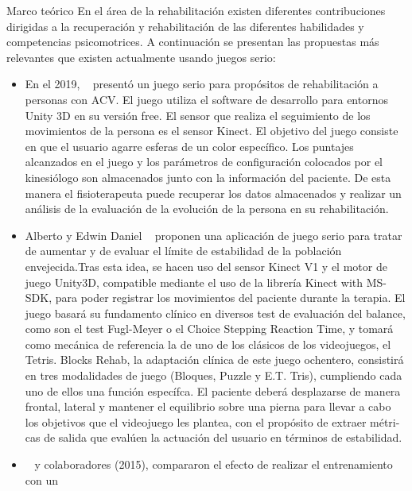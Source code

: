 \begin{thesischapter}{1} {Marco teórico}
    \vspace{10pt}
    En el área de la rehabilitación %
    existen diferentes contribuciones dirigidas a la recuperación y rehabilitación de las diferentes habilidades y competencias psicomotrices. 
    A continuación se presentan las propuestas más relevantes que existen actualmente usando juegos serio:
    \begin{itemize}
        \item En el 2019, ~\cite{rodriguez2019design} presentó un juego serio para propósitos de rehabilitación a personas con ACV. El juego 
        utiliza el software de desarrollo para entornos Unity 3D en su versión free. El sensor que realiza el seguimiento de los movimientos 
        de la persona es el sensor Kinect. El objetivo del juego consiste en que el usuario agarre esferas de un color específico. Los puntajes 
        alcanzados en el juego y los parámetros de configuración colocados por el kinesiólogo son almacenados junto con la información del paciente. 
        De esta manera el fisioterapeuta puede recuperar los datos almacenados y realizar un análisis de la evaluación de la evolución de la persona 
        en su rehabilitación.
        \item Alberto y Edwin Daniel ~\cite{morales2019desarrollo} proponen una aplicación de juego serio para tratar de aumentar y de evaluar 
        el límite de estabilidad de la población envejecida.Tras esta idea, se hacen uso del sensor Kinect V1 y el 
        motor de juego Unity3D, compatible mediante el uso de la librería Kinect with MS-SDK, para poder registrar los movimientos del paciente durante 
        la terapia. El juego basará su fundamento clínico en diversos test de evaluación del balance, como son el test Fugl-Meyer o el Choice Stepping 
        Reaction Time, y tomará como mecánica de referencia la de uno de los clásicos de los videojuegos, el Tetris. Blocks Rehab, la adaptación clínica 
        de este juego ochentero, consistirá en tres modalidades de juego (Bloques, Puzzle y E.T. Tris), cumpliendo cada uno de ellos una función específca. 
        El paciente deberá desplazarse de manera frontal, lateral y mantener el equilibrio sobre una pierna para llevar a cabo los objetivos que el 
        videojuego les plantea, con el propósito de extraer métri- cas de salida que evalúen la actuación del usuario en términos de estabilidad. 
        \item ~\cite{doi:10.1177/1545968314535985} y colaboradores (2015), compararon el efecto de realizar el entrenamiento con un

\end{itemize}
\end{thesischapter}

